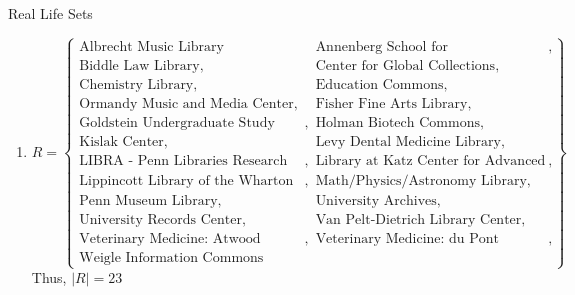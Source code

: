 \documentclass[11pt, nopagenumbers]{adamblan-hw}
\begin{document}
\begin{question}{Real Life Sets}
    \begin{enumerate}[label=\Alph*.]
        \item 
            $R = \left\{ 
                    \begin{matrix}
                        \text{Albrecht Music Library} &
                        \text{Annenberg School for Communication Library}, \\
                        \text{Biddle Law Library}, &
                        \text{Center for Global Collections}, \\
                        \text{Chemistry Library}, &
                        \text{Education Commons}, \\
                        \text{Ormandy Music and Media Center}, &
                        \text{Fisher Fine Arts Library}, \\
                        \text{Goldstein Undergraduate Study Center}, &
                        \text{Holman Biotech Commons}, \\
                        \text{Kislak Center}, &
                        \text{Levy Dental Medicine Library}, \\
                        \text{LIBRA - Penn Libraries Research Annex}, &
                        \text{Library at Katz Center for Advanced Judaic Studies}, \\
                        \text{Lippincott Library of the Wharton School}, &
                        \text{Math/Physics/Astronomy Library}, \\
                        \text{Penn Museum Library}, &
                        \text{University Archives}, \\
                        \text{University Records Center}, &
                        \text{Van Pelt-Dietrich Library Center}, \\
                        \text{Veterinary Medicine: Atwood Library and Information Commons}, &
                        \text{Veterinary Medicine: du Pont Library}, \\
                        \text{Weigle Information Commons} 
                    \end{matrix}
                     \right\}$ \\
        Thus, $\vert R\vert = 23$


\end{enumerate}
\end{question}
\end{document}
